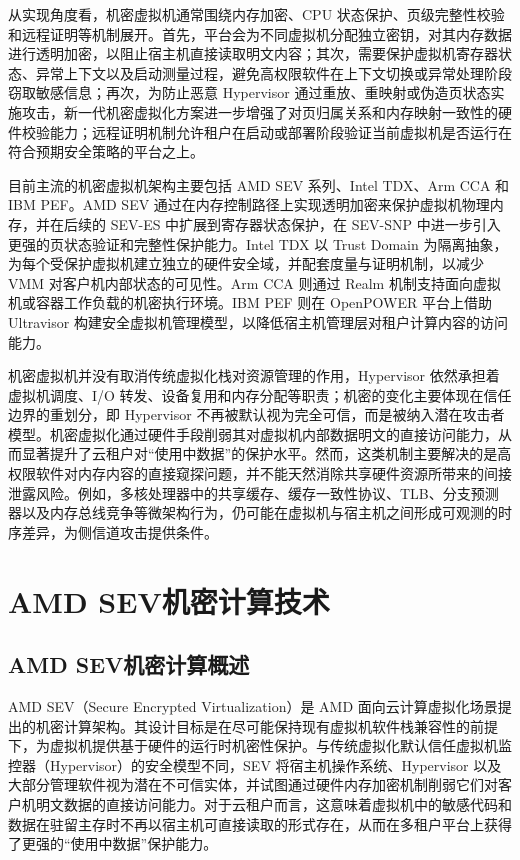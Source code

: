 从实现角度看，机密虚拟机通常围绕内存加密、CPU 状态保护、页级完整性校验和远程证明等机制展开。首先，平台会为不同虚拟机分配独立密钥，对其内存数据进行透明加密，以阻止宿主机直接读取明文内容；其次，需要保护虚拟机寄存器状态、异常上下文以及启动测量过程，避免高权限软件在上下文切换或异常处理阶段窃取敏感信息；再次，为防止恶意 Hypervisor 通过重放、重映射或伪造页状态实施攻击，新一代机密虚拟化方案进一步增强了对页归属关系和内存映射一致性的硬件校验能力；远程证明机制允许租户在启动或部署阶段验证当前虚拟机是否运行在符合预期安全策略的平台之上\cite{kaplan2016amd,cheng2024intel,hunt2021confidential}。

目前主流的机密虚拟机架构主要包括 AMD SEV 系列、Intel TDX、Arm CCA 和 IBM PEF。AMD SEV 通过在内存控制路径上实现透明加密来保护虚拟机物理内存，并在后续的 SEV-ES 中扩展到寄存器状态保护，在 SEV-SNP 中进一步引入更强的页状态验证和完整性保护能力\cite{kaplan2016amd}。Intel TDX 以 Trust Domain 为隔离抽象，为每个受保护虚拟机建立独立的硬件安全域，并配套度量与证明机制，以减少 VMM 对客户机内部状态的可见性\cite{cheng2024intel}。Arm CCA 则通过 Realm 机制支持面向虚拟机或容器工作负载的机密执行环境\cite{li2022design}。IBM PEF 则在 OpenPOWER 平台上借助 Ultravisor 构建安全虚拟机管理模型，以降低宿主机管理层对租户计算内容的访问能力\cite{hunt2021confidential}。

机密虚拟机并没有取消传统虚拟化栈对资源管理的作用，Hypervisor 依然承担着虚拟机调度、I/O 转发、设备复用和内存分配等职责；机密的变化主要体现在信任边界的重划分，即 Hypervisor 不再被默认视为完全可信，而是被纳入潜在攻击者模型。机密虚拟化通过硬件手段削弱其对虚拟机内部数据明文的直接访问能力，从而显著提升了云租户对“使用中数据”的保护水平。然而，这类机制主要解决的是高权限软件对内存内容的直接窥探问题，并不能天然消除共享硬件资源所带来的间接泄露风险。例如，多核处理器中的共享缓存、缓存一致性协议、TLB、分支预测器以及内存总线竞争等微架构行为，仍可能在虚拟机与宿主机之间形成可观测的时序差异，为侧信道攻击提供条件\cite{lou2022survey,ge2018survey,chiang2025reloadreload,giner2025coherereload}。

\section{AMD SEV机密计算技术}

\subsection{AMD SEV机密计算概述}

AMD SEV（Secure Encrypted Virtualization）是 AMD 面向云计算虚拟化场景提出的机密计算架构。其设计目标是在尽可能保持现有虚拟机软件栈兼容性的前提下，为虚拟机提供基于硬件的运行时机密性保护\cite{kaplan2016amd,amd64manual}。与传统虚拟化默认信任虚拟机监控器（Hypervisor）的安全模型不同，SEV 将宿主机操作系统、Hypervisor 以及大部分管理软件视为潜在不可信实体，并试图通过硬件内存加密机制削弱它们对客户机明文数据的直接访问能力。对于云租户而言，这意味着虚拟机中的敏感代码和数据在驻留主存时不再以宿主机可直接读取的形式存在，从而在多租户平台上获得了更强的“使用中数据”保护能力。

